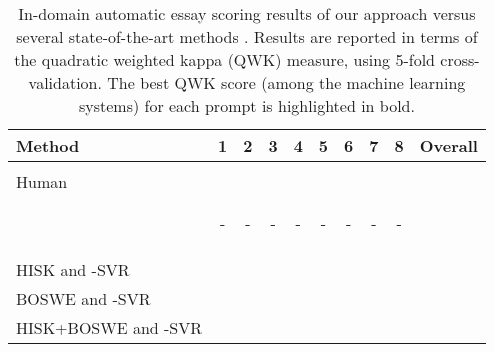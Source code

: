 \documentclass[11pt,a4paper]{article}
\begin{document}
\begin{table*}[!t]
\setlength\tabcolsep{3.5pt}
\begin{center}
\begin{tabular}{lccccccccc}
\hline
Method 											& 1								&	2								& 3								& 4 						
					& 5 								& 6								& 7 								& 8 								& Overall\\
\hline
\hline
\vspace{-0.9em}\\
Human												&  					&  					&  					& 
					&  					&  					& 					& 					& \\
\hline
\vspace{-0.9em}\\
\cite{Phandi-EMNLP-2015}				&  					&  					&  					& 
					&  					&  					& 					& 					& \\
															
\cite{Dong-EMNLP-2016}				& - 								& - 								& - 								& -
					& - 								& - 								& -								& -								& \\
															
\cite{Dong-CONLL-2017}				&  					&  					&  					& 
					&  					&  					& 					&  					& \\
																									
\cite{Tay-ACL-2018}						&  					&  					&  	& 
					&  					&  					& 					& 					& \\
\hline
\vspace{-0.9em}\\
HISK and -SVR						&  					&  					&  					& 
					&  					&  					& 					& 					& \\
																					
BOSWE and -SVR					&  					&  					&  					& 
					&  					&  					& 					& 					& \\
																					
HISK+BOSWE and -SVR			&  	&  	&  					& 
					& 	& 	& 	& 	& \\
\hline
\end{tabular}
\end{center}
\vspace*{-0.2cm}
\caption{In-domain automatic essay scoring results of our approach versus several state-of-the-art methods \cite{Phandi-EMNLP-2015,Dong-EMNLP-2016,Dong-CONLL-2017,Tay-ACL-2018}. Results are reported in terms of the quadratic weighted kappa (QWK) measure, using 5-fold cross-validation. The best QWK score (among the machine learning systems) for each prompt is highlighted in bold.}
\label{tab_AES_in}
\vspace*{-0.3cm}
\end{table*}
\end{document}
